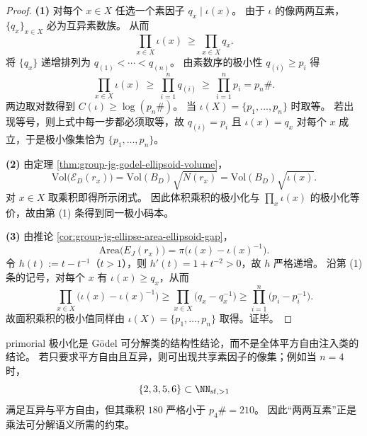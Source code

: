 \begin{proof}
\textbf{(1)}
对每个 \(x\in X\) 任选一个素因子 \(q_x\mid \iota(x)\)。
由于 \(\iota\) 的像两两互素，\(\{q_x\}_{x\in X}\) 必为互异素数族。
从而
\[
\prod_{x\in X}\iota(x)\ \ge\ \prod_{x\in X}q_x.
\]
将 \(\{q_x\}\) 递增排列为 \(q_{(1)}<\cdots<q_{(n)}\)。
由素数序的极小性 \(q_{(i)}\ge p_i\) 得
\[
\prod_{x\in X}\iota(x)\ \ge\ \prod_{i=1}^{n}q_{(i)}
\ \ge\ \prod_{i=1}^{n}p_i
=p_n\#.
\]
两边取对数得到 \(C(\iota)\ge \log(p_n\#)\)。
当 \(\iota(X)=\{p_1,\dots,p_n\}\) 时取等。
若出现等号，则上式中每一步都必须取等，故 \(q_{(i)}=p_i\) 且 \(\iota(x)=q_x\) 对每个 \(x\) 成立，于是极小像集恰为 \(\{p_1,\dots,p_n\}\)。

\textbf{(2)}
由定理 \ref{thm:group-jg-godel-ellipsoid-volume}，
\[
\mathrm{Vol}\bigl(\mathcal E_D(r_x)\bigr)=\mathrm{Vol}(B_D)\sqrt{N(r_x)}
=\mathrm{Vol}(B_D)\sqrt{\iota(x)}.
\]
对 \(x\in X\) 取乘积即得所示闭式。
因此体积乘积的极小化与 \(\prod_x\iota(x)\) 的极小化等价，故由第 (1) 条得到同一极小码本。

\textbf{(3)}
由推论 \ref{cor:group-jg-ellipse-area-ellipsoid-gap}，
\[
\mathrm{Area}\bigl(E_J(r_x)\bigr)=\pi\bigl(\iota(x)-\iota(x)^{-1}\bigr).
\]
令 \(h(t):=t-t^{-1}\)（\(t>1\)），则 \(h'(t)=1+t^{-2}>0\)，故 \(h\) 严格递增。
沿第 (1) 条的记号，对每个 \(x\) 有 \(\iota(x)\ge q_x\)，从而
\[
\prod_{x\in X}\bigl(\iota(x)-\iota(x)^{-1}\bigr)
\ge
\prod_{x\in X}\bigl(q_x-q_x^{-1}\bigr)
\ge
\prod_{i=1}^{n}\bigl(p_i-p_i^{-1}\bigr).
\]
故面积乘积的极小值同样由 \(\iota(X)=\{p_1,\dots,p_n\}\) 取得。证毕。
\end{proof}

\begin{remark}[互素约束的必要性]\label{rem:group-jg-min-total-godel-cost-coprime-necessity}
primorial 极小化是 Gödel 可分解类的结构性结论，而不是全体平方自由注入类的结论。
若只要求平方自由且互异，则可出现共享素因子的像集；例如当 \(n=4\) 时，
\[
\{2,3,5,6\}\subset \NN_{\mathrm{sf},>1}
\]
满足互异与平方自由，但其乘积 \(180\) 严格小于 \(p_4\#=210\)。
因此“两两互素”正是乘法可分解语义所需的约束。
\end{remark}

\endinput
